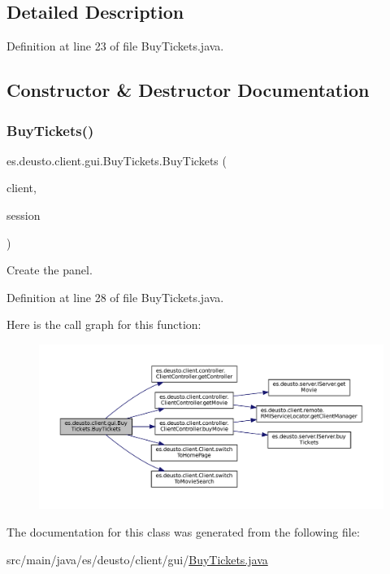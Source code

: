 \subsection{Detailed Description}


Definition at line 23 of file Buy\+Tickets.\+java.



\subsection{Constructor \& Destructor Documentation}
\mbox{\label{classes_1_1deusto_1_1client_1_1gui_1_1_buy_tickets_a550c5b4787c8ffd333049cf8d6c32e48}} 
\subsubsection{\texorpdfstring{BuyTickets()}{BuyTickets()}}
{\footnotesize\ttfamily es.\+deusto.\+client.\+gui.\+Buy\+Tickets.\+Buy\+Tickets (\begin{DoxyParamCaption}\item[{\mbox{\hyperlink{classes_1_1deusto_1_1client_1_1_client}{Client}}}]{client,  }\item[{\mbox{\hyperlink{classes_1_1deusto_1_1server_1_1data_1_1_session_d_t_o}{Session\+D\+TO}}}]{session }\end{DoxyParamCaption})}

Create the panel. 

Definition at line 28 of file Buy\+Tickets.\+java.

Here is the call graph for this function\+:
\nopagebreak
\begin{figure}[H]
\begin{center}
\leavevmode
\includegraphics[width=350pt]{classes_1_1deusto_1_1client_1_1gui_1_1_buy_tickets_a550c5b4787c8ffd333049cf8d6c32e48_cgraph}
\end{center}
\end{figure}


The documentation for this class was generated from the following file\+:\begin{DoxyCompactItemize}
\item 
src/main/java/es/deusto/client/gui/\mbox{\hyperlink{_buy_tickets_8java}{Buy\+Tickets.\+java}}\end{DoxyCompactItemize}
